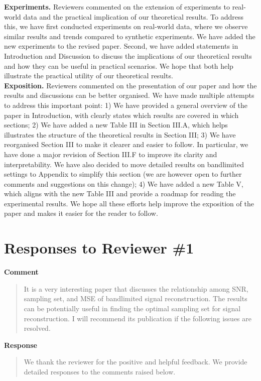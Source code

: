 \documentclass[11pt,onecolumn,journal]{IEEEtran}
\theoremstyle{definition}
\begin{document}
\textbf{Experiments.}
Reviewers commented on the extension of experiments to real-world data and the practical implication of our theoretical results. To address this, we have first conducted experiments on real-world data, where we observe similar results and trends compared to synthetic experiments. We have added the new experiments to the revised paper. Second, we have added statements in Introduction and Discussion to discuss the implications of our theoretical results and how they can be useful in practical scenarios. We hope that both help illustrate the practical utility of our theoretical results.\\

\textbf{Exposition.}
Reviewers commented on the presentation of our paper and how the results and discussions can be better organised. We have made multiple attempts to address this important point: 1) We have provided a general overview of the paper in Introduction, with clearly states which results are covered in which sections; 2) We have added a new Table III in Section III.A, which helps illustrates the structure of the theoretical results in Section III; 3) We have reorganised Section III to make it clearer and easier to follow. In particular, we have done a major revision of Section III.F to improve its clarity and interpretability. We have also decided to move detailed results on bandlimited settings to Appendix to simplify this section (we are however open to further comments and suggestions on this change); 4) We have added a new Table V, which aligns with the new Table III and provide a roadmap for reading the experimental results. We hope all these efforts help improve the exposition of the paper and makes it easier for the reader to follow.


\clearpage
\section*{Responses to Reviewer \#1}

\textbf{Comment}
\begin{quote}
It is a very interesting paper that discusses the relationship among SNR, sampling set, and MSE of bandlimited signal reconstruction. The results can be potentially useful in finding the optimal sampling set for signal reconstruction. I will recommend its publication if the following issues are resolved.
\end{quote}
\textbf{Response}
\begin{quote}
We thank the reviewer for the positive and helpful feedback. We provide detailed responses to the comments raised below. %
\end{quote}
\end{document}
